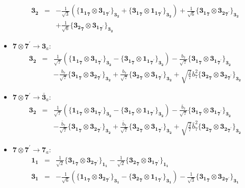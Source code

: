 \documentclass[english]{article}
\newcommand{\subcg}[3]{\big\{ {#1}\otimes{#2}\big\}^{}_{#3}}
\newcommand{\rep}[1]{\mathbf{#1}}
\begin{document}
\begin{itemize}
\begin{eqnarray*}
\\
\rep{3_2} &=& -\frac{1}{\sqrt{3}}\left(\subcg{\rep{1_1}_{\rep{7}}}{\rep{3_1}_{\rep{7}^{\prime}}}{\rep{3_2}}+\subcg{\rep{3_1}_{\rep{7}}}{\rep{1_1}_{\rep{7}^{\prime}}}{\rep{3_2}}\right)+\frac{1}{\sqrt{6}}\subcg{\rep{3_1}_{\rep{7}}}{\rep{3_2}_{\rep{7}^{\prime}}}{\rep{3_2}} \\ 
 & & +\frac{1}{\sqrt{6}}\subcg{\rep{3_2}_{\rep{7}}}{\rep{3_1}_{\rep{7}^{\prime}}}{\rep{3_2}}
\end{eqnarray*}
\item $\rep{7}\otimes\rep{7}^{\prime}\to\rep{3}_{a}$:
\begin{eqnarray*}
\rep{3_2} &=& \frac{1}{\sqrt{7}}\left(\subcg{\rep{1_1}_{\rep{7}}}{\rep{3_1}_{\rep{7}^{\prime}}}{\rep{3_2}}-\subcg{\rep{3_1}_{\rep{7}}}{\rep{1_1}_{\rep{7}^{\prime}}}{\rep{3_2}}\right)-\frac{b_7}{\sqrt{7}}\subcg{\rep{3_1}_{\rep{7}}}{\rep{3_1}_{\rep{7}^{\prime}}}{\rep{3_2}} \\ 
 & & -\frac{b_7}{\sqrt{7}}\subcg{\rep{3_1}_{\rep{7}}}{\rep{3_2}_{\rep{7}^{\prime}}}{\rep{3_2}}+\frac{b_7}{\sqrt{7}}\subcg{\rep{3_2}_{\rep{7}}}{\rep{3_1}_{\rep{7}^{\prime}}}{\rep{3_2}}+\sqrt{\frac{2}{7}} b_7^2\subcg{\rep{3_2}_{\rep{7}}}{\rep{3_2}_{\rep{7}^{\prime}}}{\rep{3_2}}
\end{eqnarray*}
\item $\rep{7}\otimes\rep{7}^{\prime}\to\rep{\bar{3}}_{a}$:
\begin{eqnarray*}
\rep{3_2} &=& \frac{1}{\sqrt{7}}\left(\subcg{\rep{1_1}_{\rep{7}}}{\rep{3_1}_{\rep{7}^{\prime}}}{\rep{3_2}}-\subcg{\rep{3_1}_{\rep{7}}}{\rep{1_1}_{\rep{7}^{\prime}}}{\rep{3_2}}\right)-\frac{\bar{b}_7}{\sqrt{7}}\subcg{\rep{3_1}_{\rep{7}}}{\rep{3_1}_{\rep{7}^{\prime}}}{\rep{3_2}} \\ 
 & & -\frac{\bar{b}_7}{\sqrt{7}}\subcg{\rep{3_1}_{\rep{7}}}{\rep{3_2}_{\rep{7}^{\prime}}}{\rep{3_2}}+\frac{\bar{b}_7}{\sqrt{7}}\subcg{\rep{3_2}_{\rep{7}}}{\rep{3_1}_{\rep{7}^{\prime}}}{\rep{3_2}}+\sqrt{\frac{2}{7}} \bar{b}_7^2\subcg{\rep{3_2}_{\rep{7}}}{\rep{3_2}_{\rep{7}^{\prime}}}{\rep{3_2}}
\end{eqnarray*}
\item $\rep{7}\otimes\rep{7}^{\prime}\to\rep{7}_{a}$:
\begin{eqnarray*}
\rep{1_1} &=& \frac{1}{\sqrt{2}}\subcg{\rep{3_1}_{\rep{7}}}{\rep{3_2}_{\rep{7}^{\prime}}}{\rep{1_1}}-\frac{1}{\sqrt{2}}\subcg{\rep{3_2}_{\rep{7}}}{\rep{3_1}_{\rep{7}^{\prime}}}{\rep{1_1}}
\\
\rep{3_1} &=& -\frac{1}{\sqrt{6}}\left(\subcg{\rep{1_1}_{\rep{7}}}{\rep{3_2}_{\rep{7}^{\prime}}}{\rep{3_1}}-\subcg{\rep{3_2}_{\rep{7}}}{\rep{1_1}_{\rep{7}^{\prime}}}{\rep{3_1}}\right)-\frac{1}{\sqrt{3}}\subcg{\rep{3_1}_{\rep{7}}}{\rep{3_2}_{\rep{7}^{\prime}}}{\rep{3_1}} \\ 

\end{eqnarray*}
\end{itemize}
\end{document}
